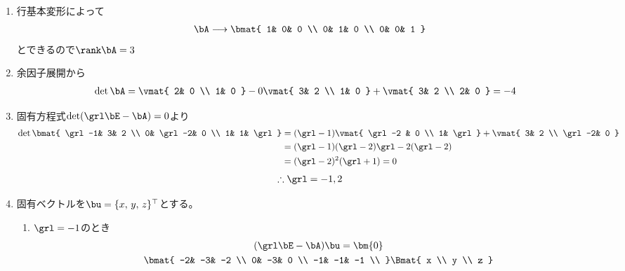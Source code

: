 \begin{ans*}
  ${}$
  \begin{enumerate}[label=(\arabic*)]
    \item 行基本変形によって
    \begin{gather}
      \bA \longrightarrow
      \bmat{
        1& 0& 0 \\
        0& 1& 0 \\
        0& 0& 1
      }
    \end{gather}
    とできるので$\rank \bA = 3$
    \item 余因子展開から
    \begin{align}
      \det \bA
      &=
      \vmat{
        2& 0 \\
        1& 0
      }
      - 0
      \vmat{
        3& 2 \\
        1& 0
      }
      +
      \vmat{
        3& 2 \\
        2& 0
      }
      = -4
    \end{align}
    \item 固有方程式$\det(\grl\bE - \bA) = 0$より
    \begin{align}
      \det
      \bmat{
        \grl-1& 3& 2 \\
        0& \grl-2& 0 \\
        1& 1& \grl
      }
      &= (\grl -1)
      \vmat{
        \grl-2 & 0 \\
        1& \grl
      }
      +
      \vmat{
        3& 2 \\
        \grl-2& 0
      } \\
      &= (\grl-1)(\grl-2)\grl - 2(\grl-2) \\
      &= (\grl-2)^2(\grl+1) = 0
    \end{align}
    \begin{gather}
      \therefore \grl = -1, 2
    \end{gather}
    \item 固有ベクトルを$\bu = \{x,\,y,\,z\}^\top$とする。
    \begin{enumerate}[label=(\roman*)]
      \item $\grl = -1$のとき
      \begin{gather}
        (\grl\bE - \bA)\bu = \bm{0} \\
        \bmat{
          -2& -3& -2 \\
          0& -3& 0 \\
          -1& -1& -1 \\
        }
        \Bmat{
          x \\ y \\ z
}
\end{gather}
\end{enumerate}
\end{enumerate}
\end{ans*}
